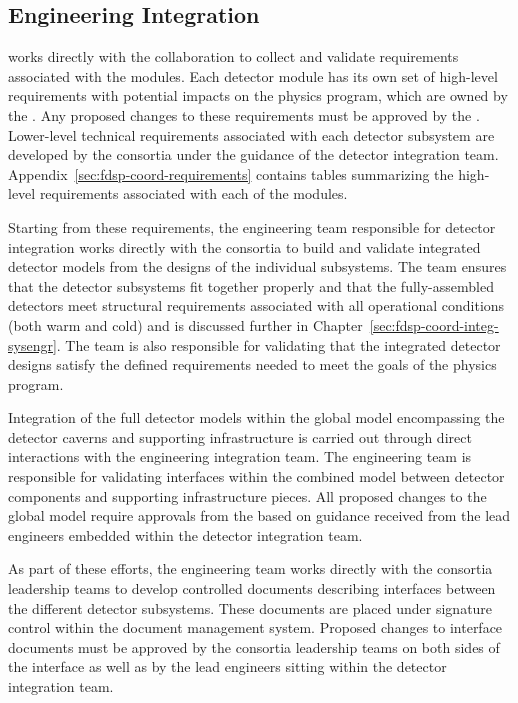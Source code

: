 \subsection{Engineering Integration}

  works directly with the collaboration to 
collect and validate requirements associated with the  
modules.  Each detector module has its own set of high-level 
requirements with potential impacts on the  physics 
program, which are owned by the  .  Any 
proposed changes to these requirements must be approved by the 
.  Lower-level technical requirements associated 
with each detector subsystem are developed by the consortia 
under the guidance of the  detector integration team.  
Appendix~\ref{sec:fdsp-coord-requirements} contains tables 
summarizing the high-level requirements associated with each of 
the  modules.

Starting from these requirements, the  engineering team
responsible for detector integration works directly with the
 consortia to build and validate integrated detector
models from the designs of the individual subsystems.  The team
ensures that the detector subsystems fit together properly and that
the fully-assembled detectors meet structural requirements associated
with all operational conditions (both warm and cold) and is discussed
further in Chapter~\ref{sec:fdsp-coord-integ-sysengr}.  The team is
also responsible for validating that the integrated detector designs
satisfy the defined requirements needed to meet the goals of the
 physics program.

Integration of the full detector models within the global model
encompassing the detector caverns and supporting infrastructure
is carried out through direct interactions with the 
engineering integration team.  The  engineering team
is responsible for validating interfaces within the combined
model between  detector components and supporting 
infrastructure pieces.  All proposed changes to the global model 
require approvals from the  based on guidance
received from the lead engineers embedded within the 
detector integration team.

As part of these efforts, the engineering team works directly 
with the consortia leadership teams to develop controlled 
documents describing interfaces between the different detector 
subsystems.  These documents are placed under signature control 
within the  document management system.  
Proposed changes to interface documents must be approved by 
the consortia leadership teams on both sides of the interface 
as well as by the lead engineers sitting within the  
detector integration team.

